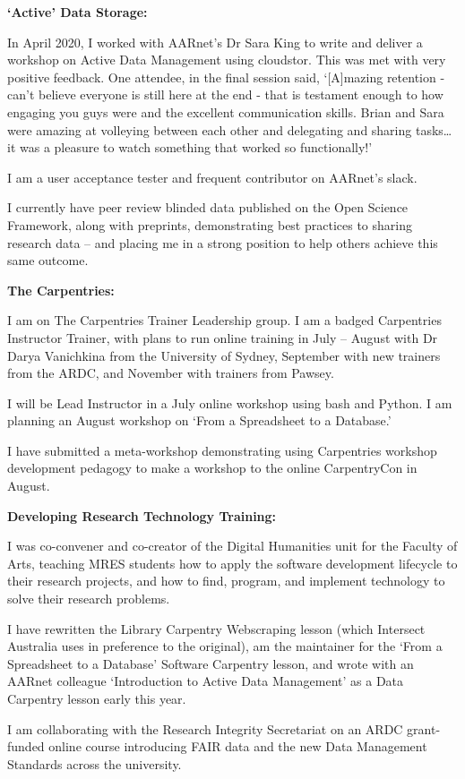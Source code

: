 \documentclass[11pt, a4paper]{awesome-cv}
\begin{document}
\begin{cvletter}
\textbf{`Active' Data Storage:} 
\begin{letteritems}
\item {In April 2020, I worked with AARnet's Dr Sara King to write and deliver a workshop on Active Data Management using cloudstor. This was met with very positive feedback. One attendee, in the final session said, `[A]mazing retention - can't believe everyone is still here at the end - that is testament enough to how engaging you guys were and
the excellent communication skills. Brian and Sara were amazing at volleying between each other and delegating and sharing
tasks… it was a pleasure to watch something that worked so functionally!'}
\item {I am a user acceptance tester and frequent contributor on AARnet's slack.}
\item {I currently have peer review blinded data published on the Open Science Framework, along with preprints, demonstrating best practices to sharing research data -- and placing me in a strong position to help others achieve this same outcome.}
\end{letteritems}

\textbf{The Carpentries:}
\begin{letteritems}
\item {I am on The Carpentries Trainer Leadership group. I am a badged Carpentries Instructor Trainer, with plans to run online training in July -- August with Dr Darya Vanichkina from the University of Sydney, September with new trainers from the ARDC, and November with trainers from Pawsey.}
\item {I will be Lead Instructor in a July online workshop using bash and Python. I am planning an August workshop on `From a Spreadsheet to a Database.'}
\item {I have submitted a meta-workshop demonstrating using Carpentries workshop development pedagogy to make a workshop to the online CarpentryCon in August.}
\end{letteritems}

\textbf{Developing Research Technology Training:} 
\begin{letteritems}
\item {I was co-convener and co-creator of the Digital Humanities unit for the Faculty of Arts, teaching MRES students how to apply the software development lifecycle to their research projects, and how to find, program, and implement technology to solve their research problems.}
\item {I have rewritten the Library Carpentry Webscraping lesson (which Intersect Australia uses in preference to the original), am the maintainer for the `From a Spreadsheet to a Database' Software Carpentry lesson, and wrote with an AARnet colleague `Introduction to Active Data Management' as a Data Carpentry lesson early this year.}
\item {I am collaborating with the Research Integrity Secretariat on an ARDC grant-funded online course introducing FAIR data and the new Data Management Standards across the university.}
\end{letteritems}


\end{cvletter}
\end{document}
